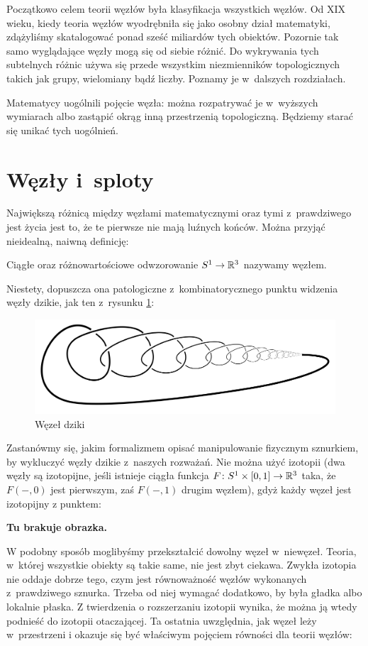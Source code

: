 Początkowo celem teorii węzłów była klasyfikacja wszystkich węzłów.
Od XIX wieku, kiedy teoria węzłów wyodrębniła się jako osobny dział matematyki,
zdążyliśmy skatalogować ponad sześć miliardów tych obiektów.
Pozornie tak samo wyglądające węzły mogą się od siebie różnić.
Do wykrywania tych subtelnych różnic używa się przede wszystkim niezmienników topologicznych takich jak grupy, wielomiany bądź liczby.
Poznamy je w~dalszych rozdziałach.

Matematycy uogólnili pojęcie węzła:
można rozpatrywać je w~wyższych wymiarach albo zastąpić okrąg inną przestrzenią topologiczną.
Będziemy starać się unikać tych uogólnień.

\section{Węzły i~sploty}
Największą różnicą między węzłami matematycznymi oraz tymi z~prawdziwego jest życia jest to, że te pierwsze nie mają luźnych końców.
Można przyjąć nieidealną, naiwną definicję:

\begin{definition}[węzeł]
    Ciągłe oraz różnowartościowe odwzorowanie $S^1 \to \mathbb R^3$ nazywamy węzłem.
\end{definition}

Niestety, dopuszcza ona patologiczne z~kombinatorycznego punktu widzenia węzły dzikie, jak ten z~rysunku \ref{wild_knot}:

\begin{figure}
    \centering
    \label{wild_knot}
    \includegraphics[width=0.5\linewidth]{wild_knot.png}
    \caption{Węzeł dziki}
\end{figure}

Zastanówmy się, jakim formalizmem opisać manipulowanie fizycznym sznurkiem, by wykluczyć węzły dzikie z~naszych rozważań.
Nie można użyć izotopii (dwa węzły są izotopijne, jeśli istnieje ciągła funkcja $F \colon S^1 \times [0, 1] \to \mathbb R^3$ taka, że $F(-, 0)$ jest pierwszym, zaś $F(-,1)$ drugim węzłem), gdyż każdy węzeł jest izotopijny z punktem:

{\color{red}\textbf{Tu brakuje obrazka.}}

W podobny sposób moglibyśmy przekształcić dowolny węzeł w~niewęzeł.
Teoria, w~której wszystkie obiekty są takie same, nie jest zbyt ciekawa.
Zwykła izotopia nie oddaje dobrze tego, czym jest równoważność węzłów wykonanych z~prawdziwego sznurka.
Trzeba od niej wymagać dodatkowo, by była gładka albo lokalnie płaska.
Z twierdzenia o rozszerzaniu izotopii wynika, że można ją wtedy podnieść do izotopii otaczającej.
Ta ostatnia uwzględnia, jak węzeł leży w~przestrzeni i okazuje się być właściwym pojęciem równości dla teorii węzłów:

